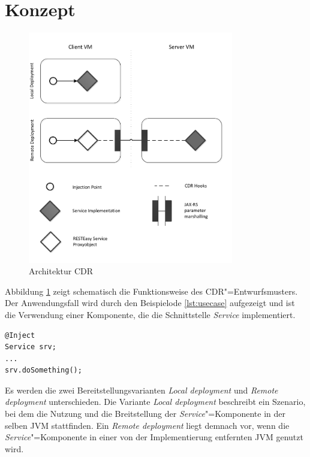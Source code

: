 \section{Konzept}
\begin{figure}
\centering
\includegraphics[width=0.8\textwidth]{img/CDR}
\caption{Architektur CDR\label{pic:cdr}}
\end{figure}
Abbildung \ref{pic:cdr} zeigt schematisch die Funktionsweise des \ac{CDR}"=Entwurfsmusters. Der Anwendungsfall wird durch den Beispielode \ref{lst:usecase} aufgezeigt und ist die Verwendung einer Komponente, die die Schnittstelle \textit{Service} implementiert.
\begin{lstlisting}[caption={Anwendungsfall CDR},captionpos=b,label=lst:usecase] 
@Inject
Service srv;
...
srv.doSomething();
\end{lstlisting}
Es werden die zwei Bereitstellungsvarianten \textit{Local deployment} und \textit{Remote deployment} unterschieden. 
Die Variante \textit{Local deployment} beschreibt ein Szenario, bei dem die Nutzung und die Breitstellung der \textit{Service}"=Komponente in der selben \ac{JVM} stattfinden. Ein \textit{Remote deployment} liegt demnach vor, wenn die \textit{Service}"=Komponente in einer von der Implementierung entfernten \ac{JVM} genutzt wird.\\ 
